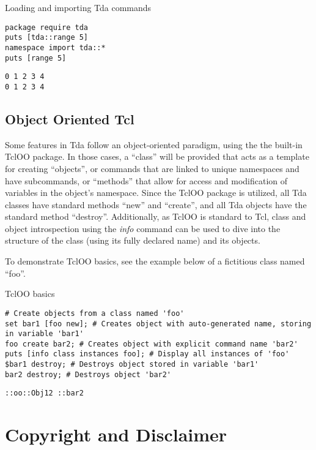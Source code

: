 \begin{example}{Loading and importing Tda commands}
\begin{lstlisting}
package require tda
puts [tda::range 5]
namespace import tda::*
puts [range 5]
\end{lstlisting}
\tcblower
\begin{lstlisting}
0 1 2 3 4
0 1 2 3 4
\end{lstlisting}
\end{example}

\clearpage
\subsection{Object Oriented Tcl}
Some features in Tda follow an object-oriented paradigm, using the the built-in TclOO package.
In those cases, a ``class'' will be provided that acts as a template for creating ``objects'', or commands that are linked to unique namespaces and have subcommands, or ``methods'' that allow for access and modification of variables in the object's namespace.
Since the TclOO package is utilized, all Tda classes have standard methods ``new'' and ``create'', and all Tda objects have the standard method ``destroy''.
Additionally, as TclOO is standard to Tcl, class and object introspection using the \textit{info} command can be used to dive into the structure of the class (using its fully declared name) and its objects.

To demonstrate TclOO basics, see the example below of a fictitious class named ``foo''.
\begin{example}{TclOO basics}
\begin{lstlisting}
# Create objects from a class named 'foo'
set bar1 [foo new]; # Creates object with auto-generated name, storing in variable 'bar1'
foo create bar2; # Creates object with explicit command name 'bar2'
puts [info class instances foo]; # Display all instances of 'foo'
$bar1 destroy; # Destroys object stored in variable 'bar1'
bar2 destroy; # Destroys object 'bar2'
\end{lstlisting}
\tcblower
\begin{lstlisting}
::oo::Obj12 ::bar2
\end{lstlisting}
\end{example}

\cleartooddpage[\thispagestyle{empty}]
\section{Copyright and Disclaimer}

